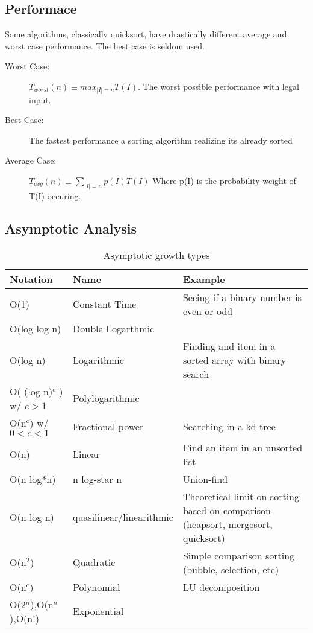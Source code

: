 		\subsection{Performace}
		Some algorithms, classically quicksort, have drastically different average and worst case performance. The best case is seldom used.
		\begin{description}
			\item[Worst Case: ] $T_{worst}(n) \equiv max_{|I|=n}T(I)$. The worst possible performance with legal input.
			\item[Best Case: ] The fastest performance \ra a sorting algorithm realizing its already sorted
			\item[Average Case: ] $T_{avg}(n) \equiv \sum_{|I|=n} p(I)T(I)$ Where p(I) is the probability weight of T(I) occuring.
		\end{description}

\subsection{Asymptotic Analysis}
\begin{table}
	\caption{Asymptotic growth types}
	\label{table:asymtoticGrowth}
	\begin{tabular}{llp{}}
\hline\hline
Notation& Name& Example\\\hline
O(1)&Constant Time&Seeing if a binary number is even or odd\\
O(log log n) &Double Logarthmic& \\
O(log n)& Logarithmic& Finding and item in a sorted array with binary search\\
O( (log n)$^c$ ) w/ $c>1$& Polylogarithmic& \\
O(n$^c$) w/ $0<c<1$&Fractional power &Searching in a kd-tree \\
O(n)& Linear& Find an item in an unsorted list\\
O(n log*n)& n log-star n& Union-find\\
O(n log n)& quasilinear/linearithmic&Theoretical limit on sorting based on comparison (heapsort, mergesort, quicksort)\\
O(n$^2$)& Quadratic&Simple comparison sorting (bubble, selection, etc)\\
O(n$^c$)& Polynomial& LU decomposition\\
O(2$^n$),O(n$^n$),O(n!)&Exponential&\\
\hline\hline
\end{tabular}
\end{table}

